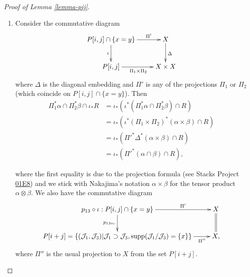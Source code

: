 \begin{proof}[Proof of Lemma \ref{lemma-pij}]
\begin{enumerate}
\medskip\noindent
(Caveat: it looks to me that the choice of
$\mathcal{J}_2'$ is not unique.
Indeed, the space of schemes of length $j$
supported
in the point $x$ was discussed in the proof
of Lemma \ref{lemma-dimension},
where we used the fact that it has dimension
$j-1$.)

\medskip\noindent
Defining $\mathcal{J}'_2$ this way implies
that
$$
\mathcal{J}_1/\mathcal{J}_2'=\mathcal{J}_1/(\mathcal{J}_1\cup \{x\})
=\{x\}=\mathcal{J}_2/\mathcal{J}_3.
$$
Now, we also must have
$\mathcal{J}_1/\mathcal{J}_2=\{y\}$
for some $y \in X$ with multiplicity $i$.
This implies that
$\mathcal{J}_1/\mathcal{J}_3=\{x\}\cup
\{y\}$
with their multiplicities.
Then
$$
\mathcal{J}_2'/\mathcal{J}_3=(\mathcal{J}_1\cup \{x\})/\mathcal{J}_3=\{y\}
=\mathcal{J}_1/\mathcal{J}_2
$$
as required.
An inverse function
defined similarly shows this is a bijection.

\item Consider the commutative diagram
$$
\xymatrix{
P[i,j]\cap
\{x=y\}\ar[r]^-{\Pi'}\ar[d]_{\iota}&X\ar[d]^{\Delta}\\
P[i,j]\ar[r]_{\Pi_1 \times \Pi_2}&X \times X
}
$$
where $\Delta$ is the diagonal embedding
and $\Pi'$ is any of the projections $\Pi_1$
or $\Pi_2$
(which coincide on  $P[i,j]\cap \{x=y\}$).
Then
\begin{equation}
\label{equation-lemma2-1}
\begin{aligned}
\Pi_1^*\alpha \cap \Pi_2^*\beta \cap\iota_*R
&=\iota_*(\iota^*(\Pi_1^*\alpha\cap\Pi_2^*\beta)\cap R)\\
&=\iota_*(\iota^*(\Pi_1\times\Pi_2)^*(\alpha\times\beta)\cap R)\\
&=\iota_*({\Pi'}^*\Delta^*(\alpha\times\beta)\cap R)\\
&=\iota_*({\Pi'}^*(\alpha\cap\beta)\cap R),
\end{aligned}
\end{equation}

\noindent
where the first equality is due
to the projection formula
(see Stacks Project
\href{https://stacks.math.columbia.edu/tag/01E8}{01E8})
and we stick with Nakajima's notation
$\alpha \times \beta$
for the tensor product $\alpha \otimes
\beta$.
We also have the commutative diagram
$$
\xymatrix{
p_{13}\circ \iota:P[i,j]\cap\{x=y\}
\ar[r]^-{\Pi'}\ar[d]_{p_{13 \circ
\iota}}&X\ar@{=}[d]\\
P[i+j]=\{(\mathcal{J}_1,\mathcal{J}_3)|\mathcal{J}_1 \supset \mathcal{J}_3,
\text{supp}(\mathcal{J}_1/\mathcal{J}_3)=\{x\}\}\ar[r]_-{\Pi''}&X,
}
$$
where $\Pi''$ is the usual projection to $X$
from the
set $P[i+j]$.


\end{enumerate}
\end{proof}
